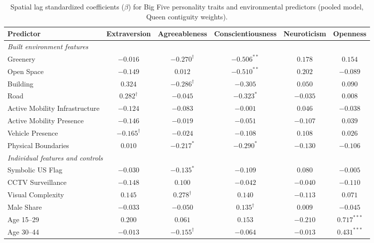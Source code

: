 \begin{table}[htbp]
\centering
\footnotesize
\caption{Spatial lag standardized coefficients ($\beta$) for Big Five personality traits and environmental predictors (pooled model, Queen contiguity weights).}
\label{tab:sar_betas_ours_v2}
\begin{adjustbox}{max width=\linewidth, max totalheight=0.85\textheight, center}
\begin{tabular}{lccccc}
\toprule
\textbf{Predictor} & \textbf{Extraversion} & \textbf{Agreeableness} & \textbf{Conscientiousness} & \textbf{Neuroticism} & \textbf{Openness} \\
\midrule
\multicolumn{6}{l}{\textit{Built environment features}} \\
Greenery & $-0.016$ & $-0.270^{\dagger}$ & $-0.506^{**}$ & $0.178$ & $0.154$ \\
Open Space & $-0.149$ & $0.012$ & $-0.510^{**}$ & $0.202$ & $-0.089$ \\
Building & $0.324$ & $-0.286^{\dagger}$ & $-0.305$ & $0.050$ & $0.090$ \\
Road & $0.282^{\dagger}$ & $-0.045$ & $-0.323^{*}$ & $-0.035$ & $0.008$ \\
Active Mobility Infrastructure & $-0.124$ & $-0.083$ & $-0.001$ & $0.046$ & $-0.038$ \\
Active Mobility Presence & $-0.146$ & $-0.019$ & $-0.051$ & $-0.107$ & $0.039$ \\
Vehicle Presence & $-0.165^{\dagger}$ & $-0.024$ & $-0.108$ & $0.108$ & $0.026$ \\
Physical Boundaries & $0.010$ & $-0.217^{*}$ & $-0.290^{*}$ & $-0.130$ & $-0.106$ \\
\midrule
\multicolumn{6}{l}{\textit{Individual features and controls}} \\
Symbolic US Flag & $-0.030$ & $-0.135^{*}$ & $-0.109$ & $0.080$ & $-0.005$ \\
CCTV Surveillance & $-0.148$ & $0.100$ & $-0.042$ & $-0.040$ & $-0.110$ \\
Visual Complexity & $0.145$ & $0.278^{\dagger}$ & $0.140$ & $-0.113$ & $0.071$ \\
Male Share & $-0.033$ & $-0.050$ & $0.135^{\dagger}$ & $0.009$ & $-0.045$ \\
Age 15--29 & $0.200$ & $0.061$ & $0.153$ & $-0.210$ & $0.717^{***}$ \\
Age 30--44 & $-0.013$ & $-0.155^{\dagger}$ & $-0.064$ & $-0.013$ & $0.431^{***}$ \\

\end{tabular}
\end{adjustbox}
\end{table}
